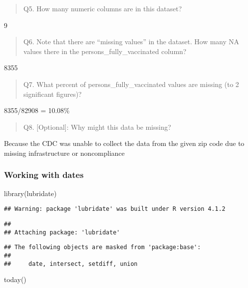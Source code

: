 \documentclass[
]{article}
\newenvironment{Shaded}{\begin{snugshade}}{\end{snugshade}}
\newcommand{\FunctionTok}[1]{\textcolor[rgb]{0.00,0.00,0.00}{#1}}
\newcommand{\NormalTok}[1]{#1}
\begin{document}
\begin{quote}
Q5. How many numeric columns are in this dataset?
\end{quote}

9

\begin{quote}
Q6. Note that there are ``missing values'' in the dataset. How many NA
values there in the persons\_fully\_vaccinated column?
\end{quote}

8355

\begin{quote}
Q7. What percent of persons\_fully\_vaccinated values are missing (to 2
significant figures)?
\end{quote}

8355/82908 = 10.08\%

\begin{quote}
Q8. {[}Optional{]}: Why might this data be missing?
\end{quote}

Because the CDC was unable to collect the data from the given zip code
due to missing infrastructure or noncompliance

\hypertarget{working-with-dates}{%
\subsubsection{Working with dates}\label{working-with-dates}}

\begin{Shaded}
\begin{Highlighting}[]
\FunctionTok{library}\NormalTok{(lubridate)}
\end{Highlighting}
\end{Shaded}

\begin{verbatim}
## Warning: package 'lubridate' was built under R version 4.1.2
\end{verbatim}

\begin{verbatim}
## 
## Attaching package: 'lubridate'
\end{verbatim}

\begin{verbatim}
## The following objects are masked from 'package:base':
## 
##     date, intersect, setdiff, union
\end{verbatim}

\begin{Shaded}
\begin{Highlighting}[]
\FunctionTok{today}\NormalTok{()}
\end{Highlighting}
\end{Shaded}
\end{document}
